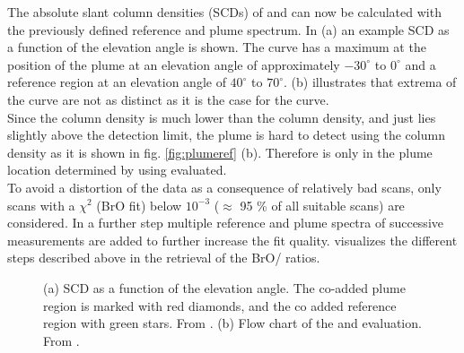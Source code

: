 The absolute slant column densities (SCDs) of   and  can now be calculated with the previously defined reference and plume spectrum.
In  (a) an example  SCD as a function of the elevation angle is shown. The  curve has a maximum at the position of the plume at an elevation angle of approximately $-30^{\circ}$ to $0^{\circ}$  and a reference region at an elevation angle of $40^{\circ}$ to $70^{\circ}$.  (b)  illustrates that  extrema of the   curve are not as distinct as it is the case for the  curve.\\
Since the  column density is much lower than the  column density, and just lies slightly above the detection limit, the plume is hard to detect using the  column density as it is shown in fig. \ref{fig:plumeref} (b). 
Therefore   is only in the plume location determined by using  evaluated.\\
To avoid a distortion of the data as a consequence of relatively bad scans, only scans with a $\chi^2$ (BrO fit) below $10^{-3}$ ($\approx$	95 \% of all suitable scans) are considered.
In a further step multiple reference and plume spectra of successive measurements are added to further increase the fit quality.
 visualizes the different steps described above in the retrieval of the BrO/ ratios.\\
\begin{figure}
	\caption{(a)  SCD as a function of the elevation angle. The co-added plume region is marked with red diamonds, and the co added reference region with green stars. From \cite{WarnachSimon}. (b) Flow chart of the   and  evaluation. From \cite{lubcke2014optical}.}
	\label{fig:algorithm}
\end{figure}

